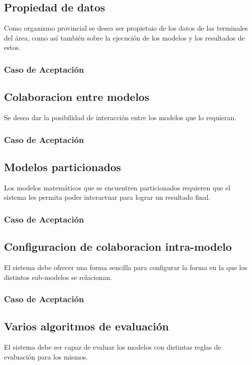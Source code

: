 \linea 
\subsection*{Propiedad de datos}
Como organizmo provincial se desea ser propietaio %
de los datos de las terminales del área, como así también sobre la ejecución de los modelos y los resultados de estos.
\subsubsection*{Caso de Aceptación}

\linea 
\subsection*{Colaboracion entre modelos}
Se desea dar la posibilidad de interacción entre los modelos que lo requieran.
\subsubsection*{Caso de Aceptación}

\linea 
\subsection*{Modelos particionados}
Los modelos matemáticos que se encuentren particionados requieren que el sistema les permita poder interactuar para lograr un resultado final.
\subsubsection*{Caso de Aceptación}

\linea 
\subsection*{Configuracion de colaboracion intra-modelo}
El sistema debe ofrecer una forma sencilla para configurar la forma en la que los distintos sub-modelos se relacionan.
\subsubsection*{Caso de Aceptación}

\linea 
\subsection*{Varios algoritmos de evaluación}
El sistema debe ser capaz de evaluar los modelos con distintas reglas de evaluación para los mismos.
